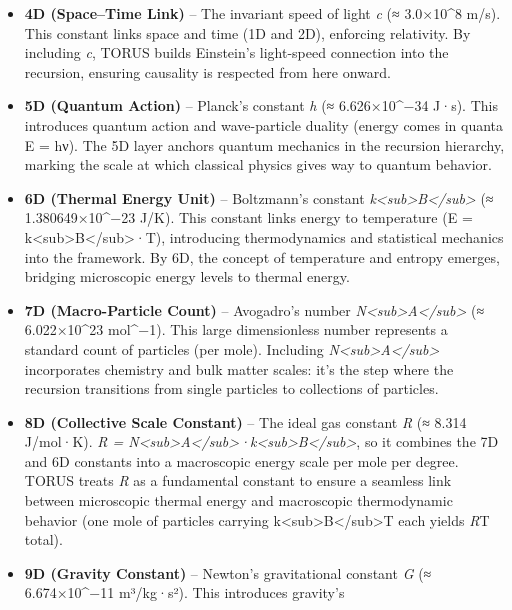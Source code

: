 \begin{itemize}
\item
  \textbf{4D (Space--Time Link)} -- The invariant speed of light
  \emph{c} (≈ 3.0×10\^{}8 m/s)​. This constant links space and time (1D
  and 2D), enforcing relativity. By including \emph{c}, TORUS builds
  Einstein's light-speed connection into the recursion, ensuring
  causality is respected from here onward.
\item
  \textbf{5D (Quantum Action)} -- Planck's constant \emph{h} (≈
  6.626×10\^{}−34 J·s)​. This introduces quantum action and
  wave-particle duality (energy comes in quanta E = hν). The 5D layer
  anchors quantum mechanics in the recursion hierarchy, marking the
  scale at which classical physics gives way to quantum behavior.
\item
  \textbf{6D (Thermal Energy Unit)} -- Boltzmann's constant
  \emph{k\textless{}sub\textgreater{}B\textless{}/sub\textgreater{}} (≈
  1.380649×10\^{}−23 J/K)​. This constant links energy to temperature (E
  = k\textless{}sub\textgreater{}B\textless{}/sub\textgreater{}·T),
  introducing thermodynamics and statistical mechanics into the
  framework. By 6D, the concept of temperature and entropy emerges,
  bridging microscopic energy levels to thermal energy.
\item
  \textbf{7D (Macro-Particle Count)} -- Avogadro's number
  \emph{N\textless{}sub\textgreater{}A\textless{}/sub\textgreater{}} (≈
  6.022×10\^{}23 mol\^{}−1)​. This large dimensionless number represents
  a standard count of particles (per mole). Including
  \emph{N\textless{}sub\textgreater{}A\textless{}/sub\textgreater{}}
  incorporates chemistry and bulk matter scales: it's the step where the
  recursion transitions from single particles to collections of
  particles.
\item
  \textbf{8D (Collective Scale Constant)} -- The ideal gas constant
  \emph{R} (≈ 8.314 J/mol·K)​. \emph{R =
  N\textless{}sub\textgreater{}A\textless{}/sub\textgreater{}·k\textless{}sub\textgreater{}B\textless{}/sub\textgreater{}},
  so it combines the 7D and 6D constants into a macroscopic energy scale
  per mole per degree​. TORUS treats \emph{R} as a fundamental constant
  to ensure a seamless link between microscopic thermal energy and
  macroscopic thermodynamic behavior (one mole of particles carrying
  k\textless{}sub\textgreater{}B\textless{}/sub\textgreater{}T each
  yields \emph{R}T total)​.
\item
  \textbf{9D (Gravity Constant)} -- Newton's gravitational constant
  \emph{G} (≈ 6.674×10\^{}−11 m³/kg·s²)​. This introduces gravity's

\end{itemize}
